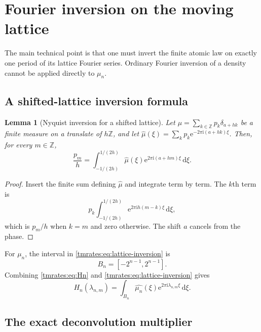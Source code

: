 \documentclass[11pt,oneside]{article}
\newtheorem{lemma}[lemma]{Lemma}
\theoremstyle{definition}
\theoremstyle{remark}
\newcommand{\Z}{\mathbb Z}
\newcommand{\e}{\mathrm e}
\newcommand{\ii}{\mathrm i}
\newcommand{\dd}{\,\mathrm d}
\begin{document}
\section{Fourier inversion on the moving lattice}
\label{tmrates:sec:fourier}

The main technical point is that one must invert the finite atomic law on exactly one period
of its lattice Fourier series.  Ordinary Fourier inversion of a density cannot be applied
directly to $\mu_n$.

\subsection{A shifted-lattice inversion formula}

\begin{lemma}[Nyquist inversion for a shifted lattice]
\label{tmrates:lem:lattice-inversion}
Let $\mu=\sum_{k\in\Z}p_k\delta_{a+hk}$ be a finite measure on a translate of $h\Z$, and let
$\widehat\mu(\xi)=\sum_kp_k\e^{-2\pi\ii(a+hk)\xi}$.  Then, for every $m\in\Z$,
\begin{equation}
 \frac{p_m}{h}
 =\int_{-1/(2h)}^{1/(2h)}
   \widehat\mu(\xi)\e^{2\pi\ii(a+hm)\xi}\dd\xi.          \label{tmrates:eq:lattice-inversion}
\end{equation}
\end{lemma}

\begin{proof}
Insert the finite sum defining $\widehat\mu$ and integrate term by term.  The $k$th term is
\[
 p_k\int_{-1/(2h)}^{1/(2h)}\e^{2\pi\ii h(m-k)\xi}\dd\xi,
\]
which is $p_m/h$ when $k=m$ and zero otherwise.  The shift $a$ cancels from the phase.
\end{proof}

For $\mu_n$, the interval in \eqref{tmrates:eq:lattice-inversion} is
\begin{equation}
 B_n=[-2^{n-1},2^{n-1}].                                   \label{tmrates:eq:Bn}
\end{equation}
Combining \eqref{tmrates:eq:Hn} and \eqref{tmrates:eq:lattice-inversion} gives
\begin{equation}
 H_n(\lambda_{n,m})
 =\int_{B_n}\widehat{\mu_n}(\xi)
   \e^{2\pi\ii\lambda_{n,m}\xi}\dd\xi.                  \label{tmrates:eq:Hn-inversion}
\end{equation}

\subsection{The exact deconvolution multiplier}
\end{document}
